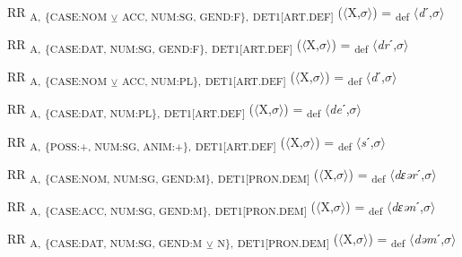 {\begin{exe}
 RR \textsubscript{A,} \textsubscript{\{CASE:NOM} \textsubscript{${\veebar}$}\textsubscript{ ACC, NUM:SG, GEND:F\},} \textsubscript{DET1[ART.DEF]} ($\langle$X,$\sigma $$\rangle$) = \textsubscript{def} $\langle$\textit{d}ˊ,$\sigma $$\rangle$
\end{exe}

\begin{exe}
 RR \textsubscript{A,} \textsubscript{\{CASE:DAT, NUM:SG, GEND:F\},} \textsubscript{DET1[ART.DEF]} ($\langle$X,$\sigma $$\rangle$) = \textsubscript{def} $\langle$\textit{dr}ˊ,$\sigma $$\rangle$
\end{exe}

\begin{exe}
 RR \textsubscript{A,} \textsubscript{\{CASE:NOM} \textsubscript{${\veebar}$}\textsubscript{ ACC, NUM:PL\},} \textsubscript{DET1[ART.DEF]} ($\langle$X,$\sigma $$\rangle$) = \textsubscript{def} $\langle$\textit{d}ˊ,$\sigma $$\rangle$
\end{exe}

\begin{exe}
 RR \textsubscript{A,} \textsubscript{\{CASE:DAT, NUM:PL\},} \textsubscript{DET1[ART.DEF]} ($\langle$X,$\sigma $$\rangle$) = \textsubscript{def} $\langle$\textit{de}ˊ,$\sigma $$\rangle$
\end{exe}

\begin{exe}
 RR \textsubscript{A,} \textsubscript{\{POSS:+, NUM:SG, ANIM:+\},} \textsubscript{DET1[ART.DEF]} ($\langle$X,$\sigma $$\rangle$) = \textsubscript{def} $\langle$\textit{s}ˊ,$\sigma $$\rangle$
\end{exe}

\begin{exe}
 RR \textsubscript{A,} \textsubscript{\{CASE:NOM, NUM:SG, GEND:M\},} \textsubscript{DET1[PRON.DEM]} ($\langle$X,$\sigma $$\rangle$) = \textsubscript{def} $\langle$\textit{dɛər}ˊ,$\sigma $$\rangle$
\end{exe}

\begin{exe}
 RR \textsubscript{A,} \textsubscript{\{CASE:ACC, NUM:SG, GEND:M\},} \textsubscript{DET1[PRON.DEM]} ($\langle$X,$\sigma $$\rangle$) = \textsubscript{def} $\langle$\textit{dɛən}ˊ,$\sigma $$\rangle$
\end{exe}

\begin{exe}
 RR \textsubscript{A,} \textsubscript{\{CASE:DAT, NUM:SG, GEND:M} \textsubscript{${\veebar}$}\textsubscript{ N\},} \textsubscript{DET1[PRON.DEM]} ($\langle$X,$\sigma $$\rangle$) = \textsubscript{def} $\langle$\textit{dəm}ˊ,$\sigma $$\rangle$
\end{exe}

}
